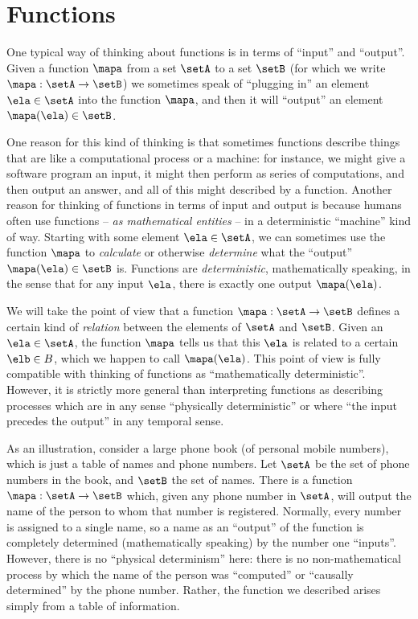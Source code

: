 

\section{Functions}
\label{sec:functions}



\bigskip


One typical way of thinking about functions is in terms of ``input'' and ``output''. Given a function $\mapa$ from a set $\setA$ to a set $\setB$ (for which we write $\mapa: \setA \to \setB$) we sometimes speak of ``plugging in'' an element $\ela \in \setA$ into the function $\mapa$, and then it will ``output'' an element $\mapa(\ela) \in \setB$. 

One reason for this kind of thinking is that sometimes functions describe things that are like a computational process or a machine: for instance, we might give a software program an input, it might then perform as series of computations, and then output an answer, and all of this might described by a function. Another reason for thinking of functions in terms of input and output is because humans often use functions -- \emph{as mathematical entities} -- in a deterministic ``machine'' kind of way. Starting with some element $\ela \in \setA$, we can sometimes use the function $\mapa$ to \emph{calculate} or otherwise \emph{determine} what the ``output'' $\mapa(\ela) \in \setB$ is. Functions are \emph{deterministic}, mathematically speaking, in the sense that for any input $\ela$, there is exactly one output $\mapa(\ela)$. 

We will take the point of view that a function $\mapa: \setA \to \setB$ defines a certain kind of \emph{relation} between the elements of $\setA$ and $\setB$. Given an $\ela \in \setA$, the function $\mapa$ tells us that this $\ela$ is related to a certain $\elb \in B$, which we happen to call $\mapa(\ela)$. This point of view is fully compatible with thinking of functions as ``mathematically deterministic''. However, it is strictly more general than interpreting functions as describing processes which are in any sense ``physically deterministic'' or where ``the input precedes the output'' in any temporal sense. 

As an illustration, consider a large phone book (of personal mobile numbers), which is just a table of names and phone numbers. Let $\setA$ be the set of phone numbers in the book, and $\setB$ the set of names. There is a function $\mapa: \setA \to \setB$ which, given any phone number in $\setA$, will output the name of the person to whom that number is registered. Normally, every number is assigned to a single name, so a name as an ``output'' of the function is completely determined (mathematically speaking) by the number one ``inputs''. However, there is no ``physical determinism'' here: there is no non-mathematical process by which the name of the person was ``computed'' or ``causally determined'' by the phone number. Rather, the function we described arises simply from a table of information. 

